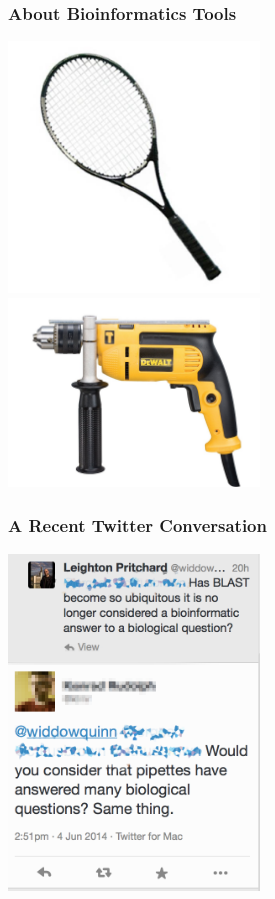 \begin{frame}
  \frametitle{About Bioinformatics Tools}
  \begin{center}
    \includegraphics[width=0.5\textwidth]{images/racquet} 
    \includegraphics[width=0.5\textwidth]{images/drill}       
  \end{center}
\end{frame}      

\begin{frame}
  \frametitle{A Recent Twitter Conversation}
  \begin{center}
    \includegraphics[width=0.5\textwidth]{images/blast_twitter1} 
  \end{center}
\end{frame}      

